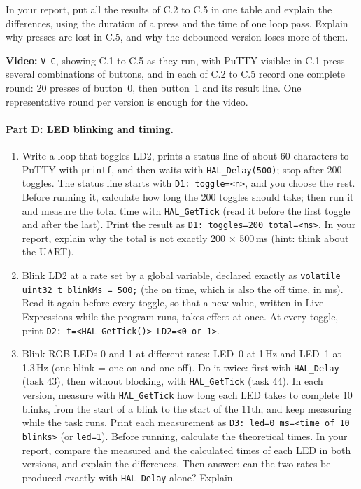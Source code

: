 \documentclass[11pt,a4paper]{article}
\begin{document}
In your report, put all the results of C.2 to C.5 in one table and explain the differences, using the duration of a
press and the time of one loop pass. Explain why presses are lost in C.5, and why the debounced version loses more of
them.

\noindent\textbf{Video:} \texttt{V\_C}, showing C.1 to C.5 as they run, with PuTTY visible: in C.1 press several
combinations of buttons, and in each of C.2 to C.5 record one complete round: 20 presses of button~0, then button~1
and its result line. One representative round per version is enough for the video.

\paragraph{Part D: LED blinking and timing.}
\begin{enumerate}[label=D.\arabic*, leftmargin=2.2em]
  \item Write a loop that toggles LD2, prints a status line of about 60 characters to PuTTY with \texttt{printf}, and
        then waits with \texttt{HAL\_Delay(500)}; stop after 200 toggles. The status line starts with
        \texttt{D1: toggle=<n>}, and you choose the rest. Before running it, calculate how long the 200 toggles should
        take; then run it and measure the total time with \texttt{HAL\_GetTick} (read it before the first toggle and
        after the last). Print the result as \texttt{D1: toggles=200 total=<ms>}. In your report, explain why the total
        is not exactly 200 $\times$ 500\,ms (hint: think about the UART).
  \item Blink LD2 at a rate set by a global variable, declared exactly as
        \texttt{volatile uint32\_t blinkMs = 500;} (the on time, which is also the off time, in ms). Read it again
        before every toggle, so that a new value, written in Live Expressions while the program runs, takes effect at
        once. At every toggle, print \texttt{D2: t=<HAL\_GetTick()> LD2=<0 or 1>}.
  \item Blink RGB LEDs 0 and 1 at different rates: LED~0 at 1\,Hz and LED~1 at 1.3\,Hz (one blink = one on and one
        off). Do it twice: first with \texttt{HAL\_Delay} (task 43), then without blocking, with \texttt{HAL\_GetTick}
        (task 44). In each version, measure with \texttt{HAL\_GetTick} how long each LED takes to complete 10 blinks,
        from the start of a blink to the start of the 11th, and keep measuring while the task runs. Print each
        measurement as \texttt{D3: led=0 ms=<time of 10 blinks>} (or \texttt{led=1}). Before running, calculate the
        theoretical times. In your report, compare the measured and the calculated times of each LED in both versions,
        and explain the differences. Then answer: can the two rates be produced exactly with \texttt{HAL\_Delay}
        alone? Explain.
\end{enumerate}
\end{document}
